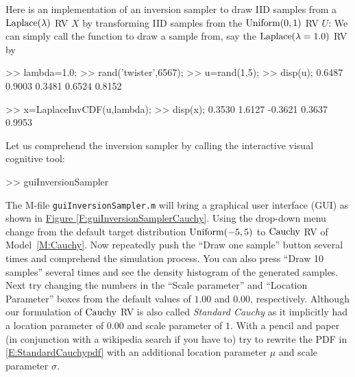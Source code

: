\begin{simulation}[$\laplace(\lambda)$] \label{SIM:Laplace}
Here is an implementation of an inversion sampler to draw IID samples from a $\laplace(\lambda)$ RV $X$ by transforming IID samples from the $\mbox{{\rm Uniform}}(0,1)$ RV $U$:
We can simply call the function to draw a sample from, say the $\mbox{{\rm Laplace}}(\lambda=1.0)$ RV by
\begin{VrbM}
>> lambda=1.0;		%
>> rand('twister',6567);        %
>> u=rand(1,5);		%
>> disp(u);		%
    0.6487    0.9003    0.3481    0.6524    0.8152

>> x=LaplaceInvCDF(u,lambda); %
>> disp(x);                     %
    0.3530    1.6127   -0.3621    0.3637    0.9953
\end{VrbM}
\end{simulation}


\begin{labwork}\label{LW:guiInversionSamplerCauchy}
Let us comprehend the inversion sampler by calling the interactive visual cognitive tool:
\begin{VrbM}
>> guiInversionSampler
\end{VrbM}
The M-file {\tt guiInversionSampler.m} will bring a graphical user interface (GUI) as shown in \hyperref[F:guiInversionSamplerCauchy]{Figure \ref*{F:guiInversionSamplerCauchy}}.  Using the drop-down menu change from the default target distribution $\mbox{{\rm Uniform}}(-5,5)$ to $\mbox{{\rm Cauchy}}$ RV of Model~\ref{M:Cauchy}.  Now repeatedly push the ``Draw one sample'' button several times and comprehend the simulation process.  You can also press ``Draw 10 samples'' several times and see the density histogram of the generated samples.  
Next try changing the numbers in the ``Scale parameter'' and ``Location Parameter'' boxes from the default values of $1.00$ and  $0.00$, respectively.  Although our formulation of $\mbox{{\rm Cauchy}}$ RV is also called {\em Standard Cauchy} as it implicitly had a location parameter of $0.00$ and scale parameter of $1$.  With a pencil and paper (in conjunction with a wikipedia search if you have to) try to rewrite the PDF in \eqref{E:StandardCauchypdf} with an additional location parameter $\mu$ and scale parameter $\sigma$.
\end{labwork}

